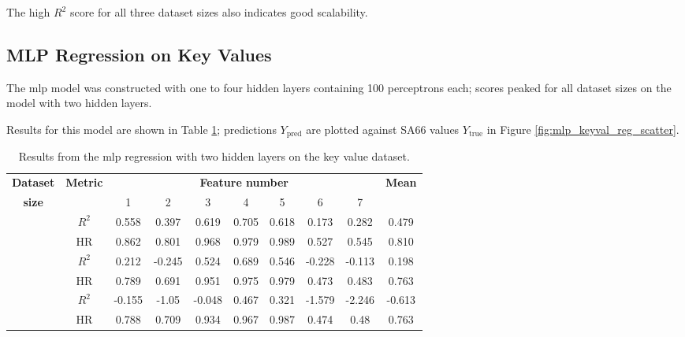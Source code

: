 The high \(R^2\) score for all three dataset sizes also indicates good scalability.


\subsection{MLP Regression on Key Values} \label{sec:res:mlp_kvs}
The \ac{mlp} model was constructed with one to four hidden layers containing 100 perceptrons each; scores peaked for all dataset sizes on the model with two hidden layers.

Results for this model are shown in Table \ref{tab:mlpreg:kvs}; predictions \(Y_{\text{pred}}\) are plotted against SA66 values \(Y_{\text{true}}\) in Figure \ref{fig:mlp_keyval_reg_scatter}.

\begin{table}
    \renewcommand{\arraystretch}{1.4}
    \begin{center}
        \caption{\label{tab:mlpreg:kvs} Results from the \ac{mlp} regression with two hidden layers on the key value dataset.}
        \begin{tabular}{ >{\bfseries}c c c c c c c c c c }
            \textbf{Dataset} & \multirow{2}{*}{\textbf{Metric}} & \multicolumn{7}{c}{\textbf{Feature number}} & \multirow{2}{*}{\textbf{Mean}} \\
            size &  & 1 & 2 & 3 & 4 & 5 & 6 & 7 \\
            \midrule
            \multirow{2}{*}{Complete}   & \(R^2\) & 0.558 & 0.397 & 0.619 & 0.705 & 0.618 & 0.173 & 0.282 & 0.479 \\
                                        & HR      & 0.862 & 0.801 & 0.968 & 0.979 & 0.989 & 0.527 & 0.545 & 0.810 \\ \cmidrule{2-10}
            \multirow{2}{*}{Reduced}    & \(R^2\) & 0.212 & -0.245 & 0.524 & 0.689 & 0.546 & -0.228 & -0.113 & 0.198 \\
                                        & HR      & 0.789 & 0.691 & 0.951 & 0.975 & 0.979 & 0.473 & 0.483 & 0.763 \\ \cmidrule{2-10}
            \multirow{2}{*}{Minimal}    & \(R^2\) & -0.155 & -1.05 & -0.048 & 0.467 & 0.321 & -1.579 & -2.246 & -0.613 \\
                                        & HR      & 0.788 & 0.709 & 0.934 & 0.967 & 0.987 & 0.474 & 0.48 & 0.763 \\
        \end{tabular}
    \end{center}
\end{table}


